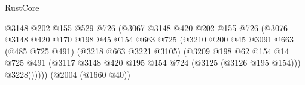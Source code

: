 \begin{lexlean}{RustCore}
\begin{coremodule}
                                                  @3148
                                                  @202
                                                  @155
                                                  @529
                                                  @726
                                                  (@3067
                                                    @3148
                                                    @420
                                                    @202
                                                    @155
                                                    @726
                                                    (@3076
                                                      @3148
                                                      @420
                                                      @170
                                                      @198
                                                      @45
                                                      @154
                                                      @663
                                                      @725
                                                      (@3210
                                                        @200
                                                        @45
                                                        @3091
                                                        @663
                                                        (@485 @725 @491)
                                                        (@3218 @663 @3221 @3105)
                                                        (@3209
                                                          @198
                                                          @62
                                                          @154
                                                          @14
                                                          @725
                                                          @491
                                                          (@3117
                                                            @3148
                                                            @420
                                                            @195
                                                            @154
                                                            @724
                                                            (@3125 (@3126 @195 @154)))
                                                          @3228))))))
                                              (@2004 (@1660 @40))

\end{coremodule}
\end{lexlean}
